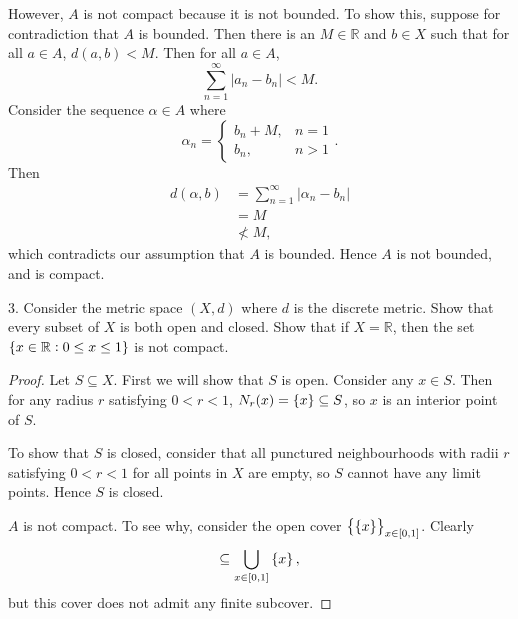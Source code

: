 \documentclass{article}
\newcommand{\R}{\mathbb{R}}
\begin{document}
However, $A$ is not compact because it is not bounded. To show this,
suppose for contradiction that $A$ is bounded. Then there is an $M \in
\R$ and $b \in X$ such that for all $a \in A$, $d(a, b) < M$.
%
Then for all $a \in A$,
%
\begin{equation*}
    \sum_{n = 1}^\infty |a_n - b_n| < M
    .
\end{equation*}
%
Consider the sequence $\alpha \in A$ where
%
\begin{equation*}
    \alpha_n = \begin{cases}
        b_n + M, &n = 1 \\
        b_n, &n > 1
    \end{cases}
    .
\end{equation*}
%
Then
%
\begin{align*}
    d(\alpha, b)
        &= \sum_{n = 1}^\infty |\alpha_n - b_n| \\
        &= M \\
        &\not< M
    ,
\end{align*}
%
which contradicts our assumption that $A$ is bounded. Hence $A$ is not bounded, and is compact.

\newpage

3. Consider the metric space $(X, d)$ where $d$ is the discrete metric.
   Show that every subset of $X$ is both open and closed. Show that if
   $X = \R$, then the set $\cbr{x \in \R: 0 \leq x \leq 1}$ is not
   compact.

\begin{proof}

Let $S \subseteq X$. First we will show that $S$ is open. Consider any
$x \in S$. Then for any radius $r$ satisfying $0 < r < 1$, $N_r(x) =
\cbr{x} \subseteq S$, so $x$ is an interior point of $S$.

To show that $S$ is closed, consider that all punctured neighbourhoods
with radii $r$ satisfying $0 < r < 1$ for all points in $X$ are empty,
so $S$ cannot have any limit points. Hence $S$ is closed.

$A$ is not compact. To see why, consider the open cover
$\cbr{\cbr{x}}_{x \in [0, 1]}$. Clearly
%
\begin{equation*}
    [0, 1] \subseteq \bigcup_{x \in [0, 1]} \cbr{x}
    ,
\end{equation*}
%
but this cover does not admit any finite subcover.

\end{proof}
\end{document}
